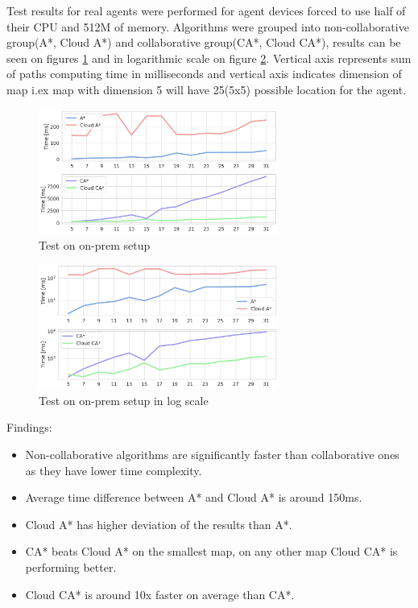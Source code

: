 Test results for real agents were performed for agent devices forced to use half of their CPU and 512M of memory. Algorithms were grouped into non-collaborative group(A*, Cloud A*) and collaborative group(CA*, Cloud CA*), results can be seen on figures \ref{fig:on_prem_test_time} and in logarithmic scale on figure \ref{fig:on_prem_test_time_log}. Vertical axis represents sum of paths computing time in milliseconds and vertical axis indicates dimension of map i.ex map with dimension 5 will have 25(5x5) possible location for the agent.

\begin{figure}
    \centering
    \includegraphics[width=0.7\textwidth]{pictures/on_prem_test_time.png}
    \caption{Test on on-prem setup}
    \label{fig:on_prem_test_time}
\end{figure}
\begin{figure}
    \centering
    \includegraphics[width=0.7\textwidth]{pictures/on_prem_test_time_log.png}
    \caption{Test on on-prem setup in log scale}
    \label{fig:on_prem_test_time_log}
\end{figure}

Findings:
\begin{itemize}
    \item Non-collaborative algorithms are significantly faster than collaborative ones as they have lower time complexity. 
    \item Average time difference between A* and Cloud A* is around 150ms.
    \item Cloud A* has higher deviation of the results than A*.
    \item CA* beats Cloud A* on the smallest map, on any other map Cloud CA* is performing better.
    \item Cloud CA* is around 10x faster on average than CA*.
\end{itemize}